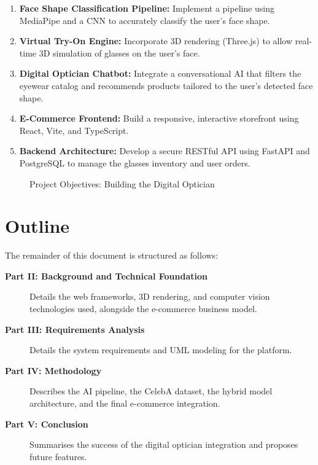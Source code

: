 \begin{enumerate}[label=\textbf{O\arabic*.}]
    \item \textbf{Face Shape Classification Pipeline:} Implement a pipeline using MediaPipe and a CNN to accurately classify the user's face shape.
    \item \textbf{Virtual Try-On Engine:} Incorporate 3D rendering (Three.js) to allow real-time 3D simulation of glasses on the user's face.
    \item \textbf{Digital Optician Chatbot:} Integrate a conversational AI that filters the eyewear catalog and recommends products tailored to the user's detected face shape.
    \item \textbf{E-Commerce Frontend:} Build a responsive, interactive storefront using React, Vite, and TypeScript.
    \item \textbf{Backend Architecture:} Develop a secure RESTful API using FastAPI and PostgreSQL to manage the glasses inventory and user orders.
\end{enumerate}

\begin{figure}[H]
    \centering
    \vspace{8cm}
    \caption{Project Objectives: Building the Digital Optician}
    \label{fig:project_objectives}
\end{figure}

\section{Outline}
\label{sec:intro_outline}

The remainder of this document is structured as follows:
\begin{description}
    \item[\textbf{Part II: Background and Technical Foundation}] Details the web frameworks, 3D rendering, and computer vision technologies used, alongside the e-commerce business model.
    \item[\textbf{Part III: Requirements Analysis}] Details the system requirements and UML modeling for the platform.
    \item[\textbf{Part IV: Methodology}] Describes the AI pipeline, the CelebA dataset, the hybrid model architecture, and the final e-commerce integration.
    \item[\textbf{Part V: Conclusion}] Summarises the success of the digital optician integration and proposes future features.
\end{description}
